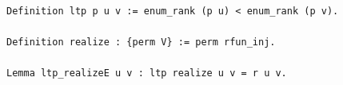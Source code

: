 \begin{lstlisting}[language=Rocq]
Definition ltp p u v := enum_rank (p u) < enum_rank (p v).

Definition realize : {perm V} := perm rfun_inj.

Lemma ltp_realizeE u v : ltp realize u v = r u v.
\end{lstlisting}
